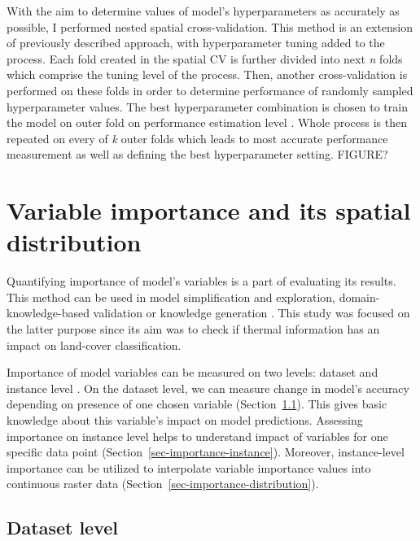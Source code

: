 \documentclass{amuthesis}
\begin{document}
With the aim to determine values of model's hyperparameters as
accurately as possible, I performed nested spatial cross-validation.
This method is an extension of previously described approach, with
hyperparameter tuning added to the process. Each fold created in the
spatial CV is further divided into next \emph{n} folds which comprise
the tuning level of the process. Then, another cross-validation is
performed on these folds in order to determine performance of randomly
sampled hyperparameter values. The best hyperparameter combination is
chosen to train the model on outer fold on performance estimation level
\autocite{schratz_hyperparameter_2019}. Whole process is then repeated
on every of \emph{k} outer folds which leads to most accurate
performance measurement as well as defining the best hyperparameter
setting. FIGURE?

\hypertarget{sec-importance}{%
\section{Variable importance and its spatial
distribution}\label{sec-importance}}

Quantifying importance of model's variables is a part of evaluating its
results. This method can be used in model simplification and
exploration, domain-knowledge-based validation or knowledge generation
\autocite{biecek_explanatory_2021}. This study was focused on the latter
purpose since its aim was to check if thermal information has an impact
on land-cover classification.

Importance of model variables can be measured on two levels: dataset and
instance level \autocite{biecek_explanatory_2021}. On the dataset level,
we can measure change in model's accuracy depending on presence of one
chosen variable (Section~\ref{sec-importance-dataset}). This gives basic
knowledge about this variable's impact on model predictions. Assessing
importance on instance level helps to understand impact of variables for
one specific data point (Section~\ref{sec-importance-instance}).
Moreover, instance-level importance can be utilized to interpolate
variable importance values into continuous raster data
(Section~\ref{sec-importance-distribution}).

\hypertarget{sec-importance-dataset}{%
\subsection{Dataset level}\label{sec-importance-dataset}}
\end{document}
